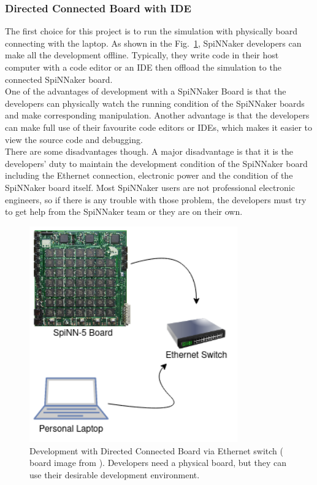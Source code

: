 \subsubsection{Directed Connected Board with IDE}
The first choice for this project is to run the simulation with physically board connecting with the laptop. As shown in the Fig.~\ref{fig:laptop}, SpiNNaker developers can make all the development offline. Typically, they write code in their host computer with a code editor or an IDE then offload the simulation to the connected SpiNNaker board.\\

One of the advantages of development with a SpiNNaker Board is that the developers can physically watch the running condition of the SpiNNaker boards and make corresponding manipulation. Another advantage is that the developers can make full use of their favourite code editors or IDEs, which makes it easier to view the source code and debugging.\\

There are some disadvantages though. A major disadvantage is that it is the developers' duty to maintain the development condition of the SpiNNaker board including the Ethernet connection, electronic power and the condition of the SpiNNaker board itself. Most SpiNNaker users are not professional electronic engineers, so if there is any trouble with those problem, the developers must try to get help from the SpiNNaker team or they are on their own. \\

\begin{figure}
\centering
   \centering
       \includegraphics[width=0.8\textwidth]{figures/laptop.png}
       \caption{Development with Directed Connected Board via Ethernet switch ( board image from \cite{spinn-core}). Developers need a physical board, but they can use their desirable development environment.}
       \label{fig:laptop}
\end{figure}


